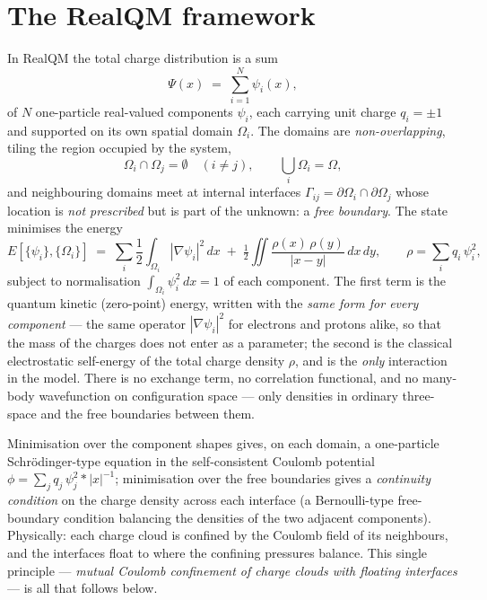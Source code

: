 \documentclass[11pt]{article}
\begin{document}
\section{The RealQM framework}

In RealQM the total charge distribution is a sum
\begin{equation}
\Psi(x) \;=\; \sum_{i=1}^{N}\psi_i(x),
\end{equation}
of $N$ one-particle real-valued components $\psi_i$, each carrying unit charge $q_i=\pm 1$ and
supported on its own spatial domain $\Omega_i$. The domains are \emph{non-overlapping}, tiling the
region occupied by the system,
\begin{equation}
\Omega_i \cap \Omega_j = \emptyset \quad (i\neq j), \qquad \bigcup_i \Omega_i = \Omega,
\end{equation}
and neighbouring domains meet at internal interfaces $\Gamma_{ij}=\partial\Omega_i\cap\partial\Omega_j$
whose location is \emph{not prescribed} but is part of the unknown: a \emph{free boundary}. The state
minimises the energy
\begin{equation}
E[\{\psi_i\},\{\Omega_i\}] \;=\;
\sum_i \frac{1}{2}\!\int_{\Omega_i}\!|\nabla\psi_i|^2\,dx
\;+\; \tfrac{1}{2}\!\iint \frac{\rho(x)\,\rho(y)}{|x-y|}\,dx\,dy,
\qquad \rho=\sum_i q_i\,\psi_i^2,
\label{eq:energy}
\end{equation}
subject to normalisation $\int_{\Omega_i}\psi_i^2\,dx=1$ of each component. The first term is the
quantum kinetic (zero-point) energy, written with the \emph{same form for every component} --- the same
operator $|\nabla\psi_i|^2$ for electrons and protons alike, so that the mass of the charges does not
enter as a parameter; the second is the classical electrostatic self-energy of the total charge density
$\rho$, and is the \emph{only} interaction in the model. There is no exchange term, no correlation functional, and no
many-body wavefunction on configuration space --- only densities in ordinary three-space and the free
boundaries between them.

Minimisation over the component shapes gives, on each domain, a one-particle Schr\"odinger-type
equation in the self-consistent Coulomb potential $\phi=\sum_j q_j\,\psi_j^2 * |x|^{-1}$; minimisation
over the free boundaries gives a \emph{continuity condition} on the charge density across each
interface (a Bernoulli-type free-boundary condition balancing the densities of the two adjacent
components). Physically: each charge cloud is confined by the Coulomb field of its neighbours, and the
interfaces float to where the confining pressures balance. This single principle --- \emph{mutual
Coulomb confinement of charge clouds with floating interfaces} --- is all that follows below.
\end{document}
